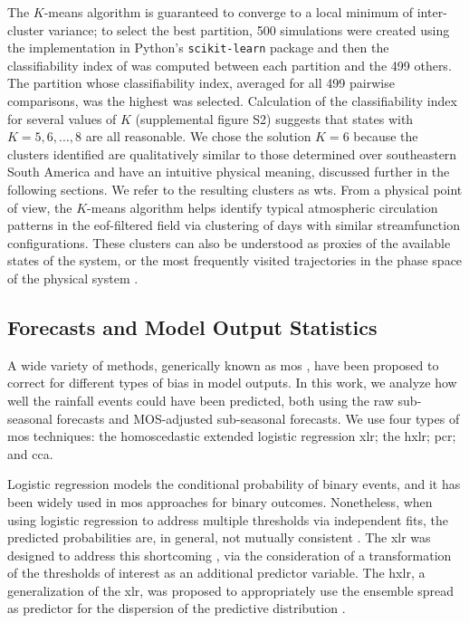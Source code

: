 \documentclass[twocol]{ametsoc}
\begin{document}
The $K$-means algorithm is guaranteed to converge to a local minimum of inter-cluster variance; to select the best partition, 500 simulations were created using the implementation in Python's \texttt{scikit-learn} package \citep{Pedregosa2012} and then the classifiability index of \citet{Michelangeli1995} was computed between each partition and the 499 others.
The partition whose classifiability index, averaged for all 499 pairwise comparisons, was the highest was selected.
Calculation of the classifiability index for several values of $K$ (supplemental figure S2) suggests that states with $K=5,6,\ldots,8$ are all reasonable.
We chose the solution $K=6$ because the clusters identified are qualitatively similar to those determined over southeastern South America \citep{Munoz2015,Munoz2016} and have an intuitive physical meaning, discussed further in the following sections.
We refer to the resulting clusters as \glspl{wt}.
From a physical point of view, the $K$-means algorithm helps identify typical atmospheric circulation patterns in the \gls{eof}-filtered field via clustering of days with similar streamfunction configurations.
These clusters can also be understood as proxies  of the available states of the system, or the most frequently visited trajectories in the phase space of the physical system \citep{Munoz2015,Munoz2016a,Munoz2017}.

\subsection{Forecasts and Model Output Statistics}

A wide variety of methods, generically known as \gls{mos} \citep{Glahn1972}, have been proposed to correct for different types of bias in model outputs.
In this work, we analyze how well the rainfall events could have been predicted, both using the raw sub-seasonal forecasts and  MOS-adjusted sub-seasonal forecasts.
We use  four types of \gls{mos} techniques: the homoscedastic extended logistic regression \gls{xlr}; the \gls{hxlr}; \gls{pcr}; and \gls{cca}.

Logistic regression models the conditional probability of binary events, and it has been widely used in \gls{mos} approaches for binary outcomes.
Nonetheless, when using logistic regression to address multiple thresholds via independent fits, the predicted probabilities are, in general, not mutually consistent \citep{Messner2014}.
The \gls{xlr} was designed to address this shortcoming \citep{Wilks2009}, via the consideration of a transformation of the thresholds of interest as an additional predictor variable.
The \gls{hxlr}, a generalization of the \gls{xlr}, was proposed to appropriately use the ensemble spread as predictor for the dispersion of the predictive distribution \citep{Messner2014}.
\end{document}
